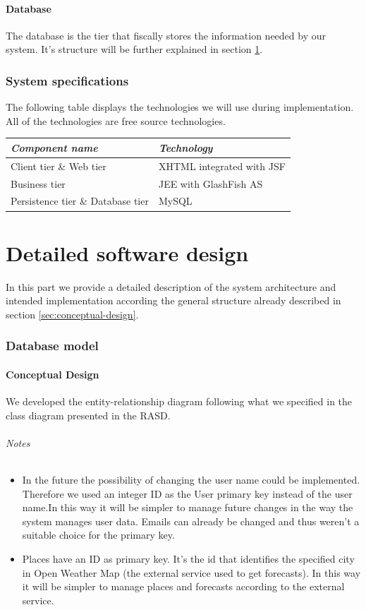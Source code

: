 \documentclass[10pt,a4paper,titlepage]{article}
\begin{document}
\subsection{Database}
The database is the tier that fiscally stores the information needed by our system. It's structure will be further explained in section \ref{sec:DatabaseModel}.

\section{System specifications}
The following table displays the technologies we will use during implementation. All of the technologies are free source technologies.

\noindent\begin{tabular}{| l | l |}
\hline	\emph{Component name}	&	\emph{Technology}	\\
\hline	Client tier \& Web tier	&	XHTML integrated with JSF	\\
\hline	Business tier			&	JEE with GlashFish AS	\\
\hline	Persistence tier \& Database tier	&	MySQL	\\
\hline
\end{tabular}

\clearpage
\part{Detailed software design}
\label{part:detailed-software-design}
In this part we provide a detailed description of the system architecture and intended implementation according the general structure already described in section \ref{sec:conceptual-design}.

\section{Database model}
\label{sec:DatabaseModel}
\subsection{Conceptual Design}
We developed the entity-relationship diagram following what we specified in the class diagram presented in the RASD. 
\paragraph{Notes}
\begin{itemize}
\item In the future the possibility of changing the user name could be implemented. Therefore we used an integer ID as the User primary key instead of the user name.In this way it will be simpler to manage future changes in the way the system manages user data. 
Emails can already be changed and thus weren't a suitable choice for the primary key.
\item Places have an ID as primary key. It's the id that identifies the specified city in Open Weather Map (the external service used to get forecasts). In this way it will be simpler to manage places and forecasts according to the external service.   
\end{itemize}
\end{document}
